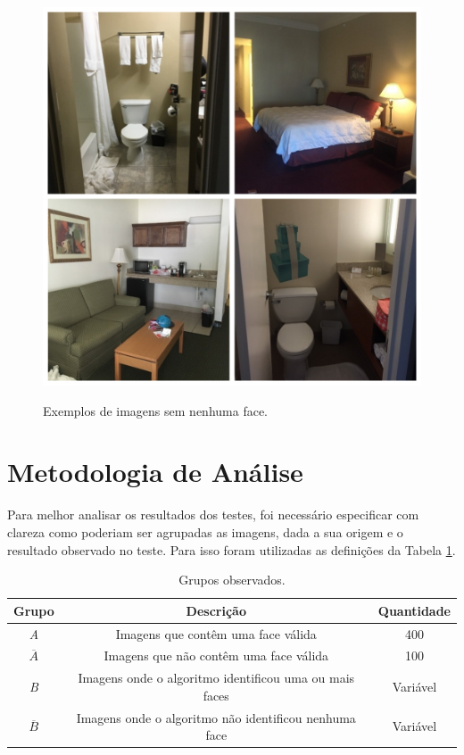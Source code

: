 \begin{figure}[tbp]
    \centering
    \caption{Exemplos de imagens sem nenhuma face.}
    \includegraphics[scale=.25]{figs/hotels.jpg}
    \label{fig:hotel-examples}
\end{figure}

\section{Metodologia de Análise}

Para melhor analisar os resultados dos testes, foi necessário especificar com clareza como poderiam ser agrupadas as imagens, dada a sua origem e o resultado observado no teste. Para isso foram utilizadas as definições da Tabela \ref{tab:grupos-images}.

\begin{table}[htbp]
    \caption{Grupos observados.}
    \label{tab:grupos-images}
    \centering
    \begin{tabular}{ccc}\hline\hline
        \textbf{Grupo} & \textbf{Descrição}                                     & \textbf{Quantidade} \\\hline
        \textit{A}     & Imagens que contêm uma face válida                     & 400                 \\
        $\overline{A}$ & Imagens que não contêm uma face válida                 & 100                 \\
        \textit{B}     & Imagens onde o algoritmo identificou uma ou mais faces & Variável            \\
        $\overline{B}$ & Imagens onde o algoritmo não identificou nenhuma face  & Variável            \\
        \hline\hline
    \end{tabular}
\end{table}

